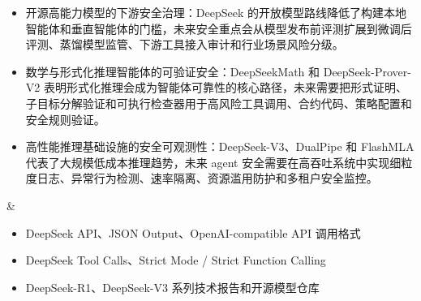 \begin{longtblr}[
  caption = {我国主流 AI 智能体安全产品与落地方向},
  label   = {tab:china-agent-security-products-verified-cited},
]
\begin{itemize}[leftmargin=*,topsep=0pt,partopsep=0pt,itemsep=1pt,parsep=0pt]


    \item 开源高能力模型的下游安全治理：DeepSeek 的开放模型路线降低了构建本地智能体和垂直智能体的门槛，未来安全重点会从模型发布前评测扩展到微调后评测、蒸馏模型监管、下游工具接入审计和行业场景风险分级。~\cite{deepseekr12025,deepseekv32024,zhang2025chisafetydeepseek}

    \item 数学与形式化推理智能体的可验证安全：DeepSeekMath 和 DeepSeek-Prover-V2 表明形式化推理会成为智能体可靠性的核心路径，未来需要把形式证明、子目标分解验证和可执行检查器用于高风险工具调用、合约代码、策略配置和安全规则验证。~\cite{deepseekproverv22025,marjanovic2025thoughtology}

    \item 高性能推理基础设施的安全可观测性：DeepSeek-V3、DualPipe 和 FlashMLA 代表了大规模低成本推理趋势，未来 agent 安全需要在高吞吐系统中实现细粒度日志、异常行为检测、速率隔离、资源滥用防护和多租户安全监控。~\cite{deepseekfyiDualPipe2026,deepseekRateIsolation2026}
  \end{itemize}
& \begin{itemize}[leftmargin=*,topsep=0pt,partopsep=0pt,itemsep=1pt,parsep=0pt]
    \item DeepSeek API、JSON Output、OpenAI-compatible API 调用格式 ~\cite{deepseekapi2026,deepseekjsonoutput2026}
    \item DeepSeek Tool Calls、Strict Mode / Strict Function Calling ~\cite{deepseektoolcalls2026}
    \item DeepSeek-R1、DeepSeek-V3 系列技术报告和开源模型仓库 ~\cite{deepseekr12025,deepseekv3github2025}
    
  \end{itemize} \\


\end{longtblr}
